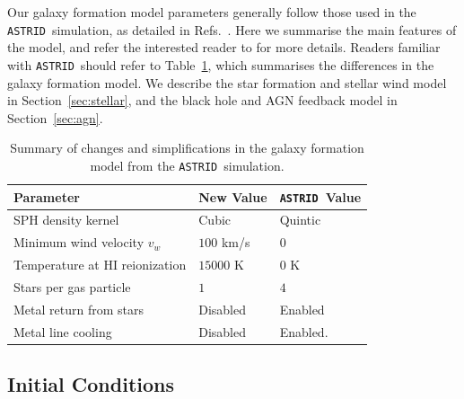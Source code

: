 \documentclass[a4paper,11pt]{article}
\newcommand{\astrid}{\texttt{ASTRID}}
\begin{document}
Our galaxy formation model parameters generally follow those used in the \astrid~simulation, as detailed in Refs.~\cite{Bird:2022, Ni:2021}. Here we summarise the main features of the model, and refer the interested reader to \cite{Bird:2022} for more details. Readers familiar with \astrid~should refer to Table~\ref{tab:paramchanges}, which summarises the differences in the galaxy formation model. We describe the star formation and stellar wind model in Section~\ref{sec:stellar}, and the black hole and AGN feedback model in Section~\ref{sec:agn}.

\begin{table}
\begin{centering}
  \begin{tabular}{lll}
  \hline
  Parameter & New Value & \astrid~Value \\
    \hline
SPH density kernel  & Cubic & Quintic \\
Minimum wind velocity $v_w$ & $100$ km/s & $0$ \\
Temperature at HI reionization & $15000$ K & $0$ K \\
Stars per gas particle & $1$ & $4$ \\
Metal return from stars & Disabled & Enabled\\
Metal line cooling & Disabled & Enabled. \\
    \hline
  \end{tabular}
  \caption{Summary of changes and simplifications in the galaxy formation model from the \astrid~simulation.}
  \label{tab:paramchanges}
  \end{centering}
\end{table}


\subsection{Initial Conditions}
\label{sec:initconds}
\end{document}
